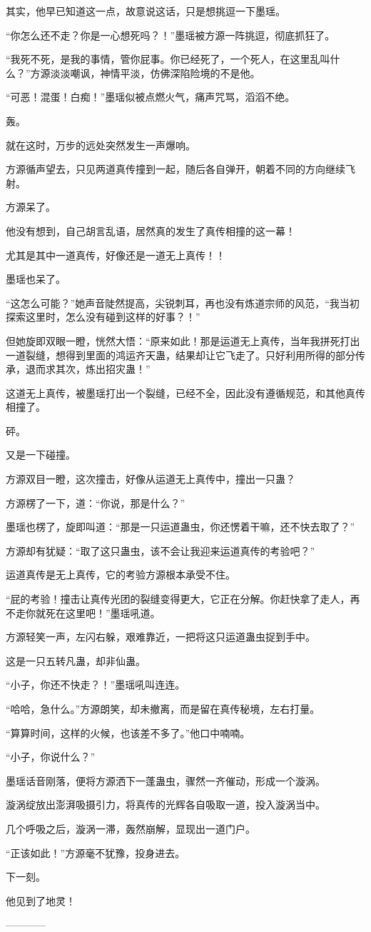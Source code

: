 \begin{this_body}
其实，他早已知道这一点，故意说这话，只是想挑逗一下墨瑶。

“你怎么还不走？你是一心想死吗？！”墨瑶被方源一阵挑逗，彻底抓狂了。

“我死不死，是我的事情，管你屁事。你已经死了，一个死人，在这里乱叫什么？”方源淡淡嘲讽，神情平淡，仿佛深陷险境的不是他。

“可恶！混蛋！白痴！”墨瑶似被点燃火气，痛声咒骂，滔滔不绝。

轰。

就在这时，万步的远处突然发生一声爆响。

方源循声望去，只见两道真传撞到一起，随后各自弹开，朝着不同的方向继续飞射。

方源呆了。

他没有想到，自己胡言乱语，居然真的发生了真传相撞的这一幕！

尤其是其中一道真传，好像还是一道无上真传！！

墨瑶也呆了。

“这怎么可能？”她声音陡然提高，尖锐刺耳，再也没有炼道宗师的风范，“我当初探索这里时，怎么没有碰到这样的好事？！”

但她旋即双眼一瞪，恍然大悟：“原来如此！那是运道无上真传，当年我拼死打出一道裂缝，想得到里面的鸿运齐天蛊，结果却让它飞走了。只好利用所得的部分传承，退而求其次，炼出招灾蛊！”

这道无上真传，被墨瑶打出一个裂缝，已经不全，因此没有遵循规范，和其他真传相撞了。

砰。

又是一下碰撞。

方源双目一瞪，这次撞击，好像从运道无上真传中，撞出一只蛊？

方源楞了一下，道：“你说，那是什么？”

墨瑶也楞了，旋即叫道：“那是一只运道蛊虫，你还愣着干嘛，还不快去取了？”

方源却有犹疑：“取了这只蛊虫，该不会让我迎来运道真传的考验吧？”

运道真传是无上真传，它的考验方源根本承受不住。

“屁的考验！撞击让真传光团的裂缝变得更大，它正在分解。你赶快拿了走人，再不走你就死在这里吧！”墨瑶吼道。

方源轻笑一声，左闪右躲，艰难靠近，一把将这只运道蛊虫捉到手中。

这是一只五转凡蛊，却非仙蛊。

“小子，你还不快走？！”墨瑶吼叫连连。

“哈哈，急什么。”方源朗笑，却未撤离，而是留在真传秘境，左右打量。

“算算时间，这样的火候，也该差不多了。”他口中喃喃。

“小子，你说什么？”

墨瑶话音刚落，便将方源洒下一蓬蛊虫，骤然一齐催动，形成一个漩涡。

漩涡绽放出澎湃吸摄引力，将真传的光辉各自吸取一道，投入漩涡当中。

几个呼吸之后，漩涡一滞，轰然崩解，显现出一道门户。

“正该如此！”方源毫不犹豫，投身进去。

下一刻。

他见到了地灵！

------------

\end{this_body}

